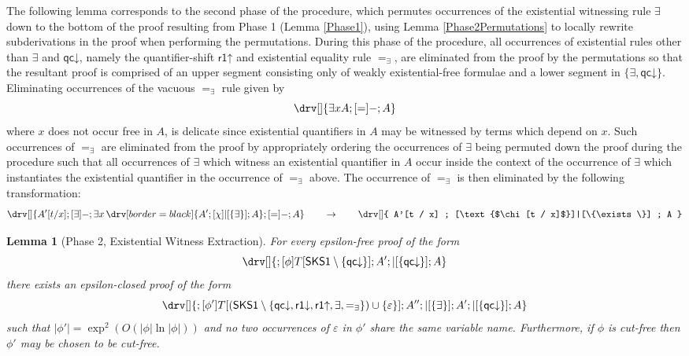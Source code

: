 \documentclass[10pt]{article}
\newtheorem{lemma}[theorem]{Lemma}
\theoremstyle{definition}\newtheorem{remark}[theorem]{Remark}
\theoremstyle{definition}\newtheorem{example}[theorem]{Example}
\theoremstyle{definition}\newtheorem{definition}[theorem]{Definition}
\newcommand{\SKSqDecomp}{{\mathsf{SKS1}}}
\newcommand{\qcDown}{{\mathsf{qc\mathord\downarrow}}}
\newcommand{\rOneUp}{{\mathsf{r1\mathord\uparrow}}}
\newcommand{\rOneDown}{{\mathsf{r1\mathord\downarrow}}}
\newcommand{\falsifierRule}{{\mathsf{\varepsilon}}}
\newcommand{\eqExists}{=_{\exists}}
\begin{document}
	The following lemma corresponds to the second phase of the procedure, which permutes occurrences of the existential witnessing rule $\exists$ down to the bottom of the proof resulting from Phase 1 (Lemma \ref{Phase1}), using Lemma \ref{Phase2Permutations} to locally rewrite subderivations in the proof when performing the permutations. During this phase of the procedure, all occurrences of existential rules other than $\exists$ and $\qcDown$, namely the quantifier-shift $\rOneUp$ and existential equality rule $\eqExists$, are eliminated from the proof by the permutations so that the resultant proof is comprised of an upper segment consisting only of weakly existential-free formulae and a lower segment in $\{\exists, \qcDown\}$. Eliminating occurrences of the vacuous $\eqExists$ rule given by
	\[
	\drv[] {
		\exists x A ; [=]- ; A
	}
	\]
	where $x$ does not occur free in $A$, is delicate since existential quantifiers in $A$ may be witnessed by terms which depend on $x$. Such occurrences of $\eqExists$ are eliminated from the proof by appropriately ordering the occurrences of $\exists$ being permuted down the proof during the procedure such that all occurrences of $\exists$ which witness an existential quantifier in $A$ occur inside the context of the occurrence of $\exists$ which instantiates the existential quantifier in the occurrence of $\eqExists$ above. The occurrence of $\eqExists$ is then eliminated by the following transformation:
	\[
	\drv[] {
		A'[t / x] ; [\exists]- ; \exists x \, \drv[border=black] {
			A' ; [\chi]|[\{\exists\}] ; A
		} ; [=]- ; A
	} \hspace{2em} \rightarrow \hspace{2em} \drv[] {
		A'[t / x] ; [\text{$\chi [t / x]$}]|[\{\exists\}] ; A
	}
	\]
	
	\begin{lemma}[Phase 2, Existential Witness Extraction]\label{Phase2}
		For every epsilon-free proof of the form
		\[
		\drv[] {
			; [\phi]T[\SKSqDecomp \setminus \{\qcDown\}] ; A' ; |[\{\qcDown\}] ; A
		}
		\]
		there exists an epsilon-closed proof of the form
		\[
		\drv[] {
			; [\phi']T[(\SKSqDecomp \setminus \{\qcDown, \rOneDown, \rOneUp, \exists, \eqExists\}) \cup \{\falsifierRule\}] ; A'' ; |[\{\exists\}] ; A' ; |[\{\qcDown\}] ; A
		}
		\]
		such that $| \phi' | = \exp^2 (O(| \phi | \ln | \phi |))$
		and no two occurrences of $\falsifierRule$ in $\phi'$ share the same variable name. Furthermore, if $\phi$ is cut-free then $\phi'$ may be chosen to be cut-free.
	\end{lemma}
	
\end{document}
